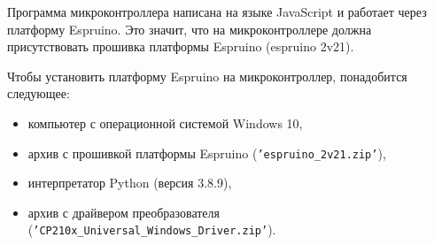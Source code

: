 \documentclass[12pt]{extarticle}
\begin{document}
Программа микроконтроллера написана на языке JavaScript и работает через платформу Espruino. Это значит, что на микроконтроллере должна присутствовать прошивка платформы Espruino (espruino 2v21). 

Чтобы установить платформу Espruino на микроконтроллер, понадобится следующее:
\begin{itemize}
	\item компьютер с операционной системой Windows 10,
	\item архив с прошивкой платформы Espruino (\texttt{'espruino\_2v21.zip'}),
	\item интерпретатор Python (версия 3.8.9),
	\item архив с драйвером преобразователя (\texttt{'CP210x\_Universal\_Windows\_\-Driver.zip'}).
\end{itemize}
\end{document}
